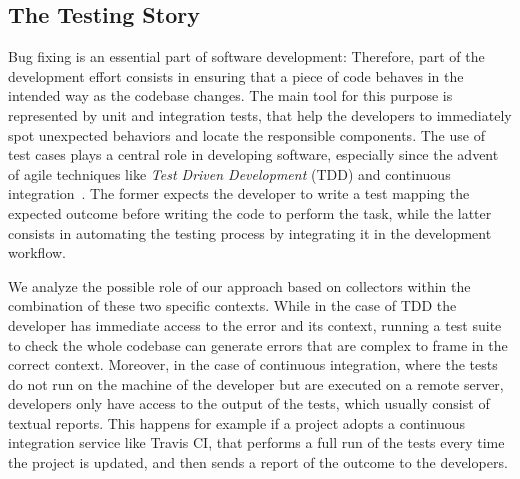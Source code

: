 \subsection{The Testing Story}\label{sec:reified-story-testing}

Bug fixing is an essential part of software development: Therefore, part of the development effort consists in ensuring that a piece of code behaves in the intended way as the codebase changes.
The main tool for this purpose is represented by unit and integration tests, that help the developers to immediately spot unexpected behaviors and locate the responsible components.
The use of test cases plays a central role in developing software, especially since the advent of agile techniques like \emph{Test Driven Development} (TDD) and continuous integration~\cite{Beck2001manifesto}.
The former expects the developer to write a test mapping the expected outcome before writing the code to perform the task, while the latter consists in automating the testing process by integrating it in the development workflow.

We analyze the possible role of our approach based on collectors within the combination of these two specific contexts.
While in the case of TDD the developer has immediate access to the error and its context, running a test suite to check the whole codebase can generate errors that are complex to frame in the correct context.
Moreover, in the case of continuous integration, where the tests do not run on the machine of the developer but are executed on a remote server, developers only have access to the output of the tests, which usually consist of textual reports.
This happens for example if a project adopts a continuous integration service like Travis CI, that performs a full run of the tests every time the project is updated, and then sends a report of the outcome to the developers.

